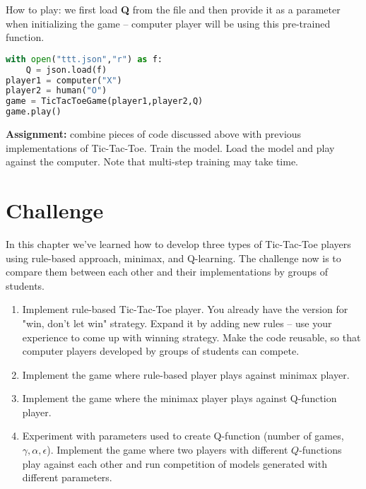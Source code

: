 How to play:
we first load \textbf{Q} from the file and then provide it as a
parameter when initializing the game -- computer player will
be using this pre-trained function.

\newpage

\begin{lstlisting}[language=Python,style=codelst2,caption={Tic-Tac-Toe: Q-learning, human against trained computer}]
with open("ttt.json","r") as f:
    Q = json.load(f)
player1 = computer("X") 
player2 = human("O")
game = TicTacToeGame(player1,player2,Q)
game.play()
\end{lstlisting}


\begin{tcolorbox}
\textbf{Assignment:} combine pieces of code discussed above
with previous implementations of Tic-Tac-Toe. Train the
model. Load the model and play against the computer. Note that
multi-step training may take time.
\end{tcolorbox}


\section{Challenge}

In this chapter we've learned how to develop three types of
Tic-Tac-Toe players using rule-based approach, minimax, and Q-learning.
The challenge now is to compare them between each other and their
implementations by groups of students.

\begin{enumerate}
\item Implement rule-based Tic-Tac-Toe player. You already have the version
for "win, don't let win" strategy. Expand it by adding new rules -- use
your experience to come up with winning strategy.
Make the code reusable, so that computer players developed by
groups of students can compete.
\item Implement the game where rule-based player plays against
 minimax player.
\item Implement the game where the minimax player plays against 
Q-function player.
\item Experiment with parameters used to create Q-function (number of
games, $\gamma, \alpha, \epsilon$). Implement the game where two players
with different $Q$-functions play against each other and run competition
of models generated with different parameters.
\end{enumerate}









